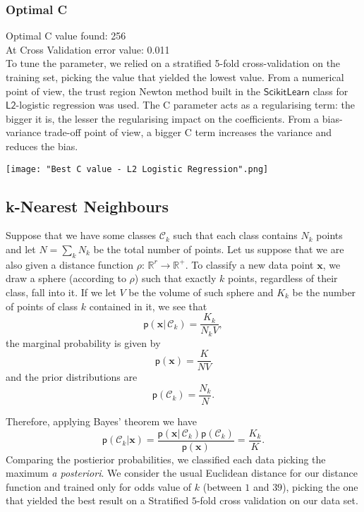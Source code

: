 \documentclass[a4paper]{article}
\begin{document}
\subsubsection{Optimal C}


Optimal C value found: 256\\
At Cross Validation error value: 0.011\\
To tune the parameter, we relied on a stratified 5-fold cross-validation
on the training set, picking the value that yielded the lowest value.
From a numerical point of view, the trust region Newton method built
in the $\mathsf{ScikitLearn}$ class for $\mathsf{L2}$-logistic regression
was used.
The C parameter acts as a regularising term: the bigger it is, the lesser the regularising impact on the coefficients.
From a bias-variance trade-off point of view, a bigger C term increases the variance and reduces the bias.

\texttt{[image: "Best C value - L2 Logistic Regression".png]}

\subsection{k-Nearest Neighbours}

Suppose that we have some classes $\mathcal{C}_{k}$ such that each
class contains $N_{k}$ points and let $N=\sum_{k}N_{k}$ be the total
number of points. Let us suppose that we are also given a distance
function $\rho:\,\mathbb{R}^{r}\rightarrow\mathbb{R}^{+}$. To classify
a new data point $\mathbf{x}$, we draw a sphere (according to $\rho$)
such that exactly $k$ points, regardless of their class, fall into
it. If we let $V$ be the volume of such sphere and $K_{k}$ be the
number of points of class $k$ contained in it, we see that 
\begin{equation}
\mathsf{p}\left(\mathbf{x}|\,\mathcal{C}_{k}\right)=\frac{K_{k}}{N_{k}V},\label{eq:-10}
\end{equation}
the marginal probability is given by 
\begin{equation}
\mathsf{p}\left(\mathbf{x}\right)=\frac{K}{NV}\label{eq:-11}
\end{equation}
and the prior distributions are 
\begin{equation}
\mathsf{p}\left(\mathcal{C}_{k}\right)=\frac{N_{k}}{N}.\label{eq:-12}
\end{equation}

Therefore, applying Bayes' theorem we have 
\begin{equation}
\mathsf{p}\left(\mathcal{C}_{k}|\mathbf{x}\right)=\frac{\mathsf{p}\left(\mathbf{x}|\,\mathcal{C}_{k}\right)\mathsf{p}\left(\mathcal{C}_{k}\right)}{\mathsf{p}\left(\mathbf{x}\right)}=\frac{K_{k}}{K}.\label{eq:-13}
\end{equation}
Comparing the postierior probabilities, we classified each data picking
the maximum \textit{a posteriori}. We consider the usual Euclidean
distance for our distance function and trained only for odds value
of $k$ (between $1$ and $39$), picking the one that yielded the
best result on a Stratified $5$-fold cross validation on our data
set.
\end{document}
